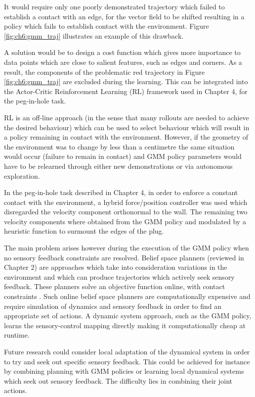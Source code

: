 It would require only one poorly demonstrated trajectory which failed to establish a contact with an edge, 
for the vector field to be shifted resulting in a policy which fails to establish
contact with the environment. Figure \ref{fig:ch6:gmm_traj} illustrates an example of this drawback.

A solution would be to design a cost function which gives more importance to data points which are close 
to salient features, such as edges and corners. As a result, the components of the problematic red trajectory in Figure 
\ref{fig:ch6:gmm_traj} are excluded during the learning. This can be integrated into the 
Actor-Critic Reinforcement Learning (RL) framework used in Chapter 4, for the peg-in-hole task.

RL is an off-line approach (in the sense that many rollouts are needed to achieve the desired behaviour) 
which can be used to select behaviour which will result in a policy remaining in contact with the environment. 
However, if the geometry of the environment was to change by less than a centimetre the same situation would occur 
(failure to remain in contact) and GMM policy parameters would have to be relearned through either new demonstrations or 
via autonomous exploration.

In the peg-in-hole task described in Chapter 4, in order to enforce a constant contact with the environment, 
a hybrid force/position controller was used which disregarded the velocity component orthonormal to the wall.
The remaining two velocity components where obtained from the GMM policy and modulated by a heuristic 
function to surmount the edges of the plug. 

The main problem arises however during the execution of the GMM policy when no sensory feedback constraints are resolved. 
Belief space planners (reviewed in Chapter 2) are approaches which take into consideration variations in the environment 
and which can produce trajectories which actively seek sensory feedback. 
These planners solve an objective function online, with contact constraints \cite{pomdp_toussain_iros_2015}.
Such online belief space planners are computationally expensive and require simulation of dynamics and sensory 
feedback in order to find an appropriate set of actions. A dynamic system approach, such as the GMM policy, 
learns the sensory-control mapping directly making it computationally cheap at runtime.

Future research could consider local adaptation of the dynamical system in order to try
and seek out specific sensory feedback. This could be achieved for instance by combining planning with 
GMM policies or learning local dynamical systems which seek out sensory feedback. The difficulty lies
in combining their joint actions.

